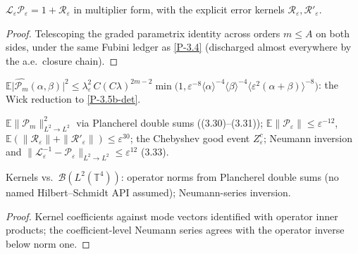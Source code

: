 \begin{lemma}\label{P-err}
  \leanok
  \(\mathcal{L}_\varepsilon\mathcal{P}_\varepsilon = 1 + \mathcal{R}_\varepsilon\)
  in multiplier form, with the explicit error kernels
  \(\mathcal{R}_\varepsilon, \mathcal{R}'_\varepsilon\).
\end{lemma}
\begin{proof}\leanok
  Telescoping the graded parametrix identity across orders \(m \le A\)
  on both sides, under the same Fubini ledger as \ref{P-3.4} (discharged
  almost everywhere by the a.e.\ closure chain).
\end{proof}

\begin{proposition}\label{P-3.5b}
  \leanok
  \(\mathbb{E}\lvert\widehat{\mathcal{P}_m}(\alpha,\beta)\rvert^2
  \le \lambda_\varepsilon^2\, C(C\lambda)^{2m-2}\min\big(1,
  \varepsilon^{-8}\langle\alpha\rangle^{-4}\langle\beta\rangle^{-4}
  \langle\varepsilon^2(\alpha+\beta)\rangle^{-8}\big)\): the Wick
  reduction to \ref{P-3.5b-det}.
\end{proposition}

\begin{proposition}\label{P-L2}
  \leanok
  \(\mathbb{E}\|\mathcal{P}_m\|^2_{L^2\to L^2}\) via Plancherel double
  sums ((3.30)--(3.31)); \(\mathbb{E}\|\mathcal{P}_\varepsilon\| \le
  \varepsilon^{-12}\), \(\mathbb{E}(\|\mathcal{R}_\varepsilon\| +
  \|\mathcal{R}'_\varepsilon\|) \le \varepsilon^{30}\); the Chebyshev good
  event \(Z_\varepsilon^c\); Neumann inversion and
  \(\|\mathcal{L}_\varepsilon^{-1} - \mathcal{P}_\varepsilon\|_{L^2\to L^2}
  \le \varepsilon^{12}\) (3.33).
\end{proposition}

\begin{lemma}\label{I-l2op}
  \leanok
  Kernels vs.\ \(\mathcal{B}(L^2(\mathbb{T}^4))\): operator norms from
  Plancherel double sums (no named Hilbert--Schmidt API assumed);
  Neumann-series inversion.
\end{lemma}
\begin{proof}\leanok
  Kernel coefficients against mode vectors identified with operator
  inner products; the coefficient-level Neumann series agrees with the
  operator inverse below norm one.
\end{proof}
